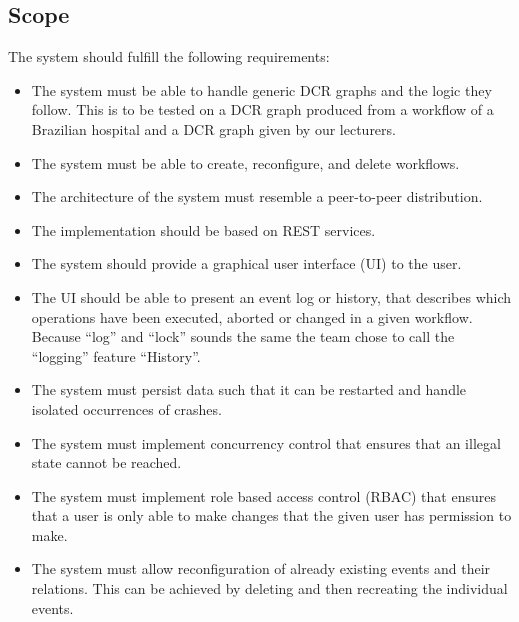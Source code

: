 \subsection{Scope}
The system should fulfill the following requirements:
\begin{itemize}
\item The system must be able to handle generic DCR graphs and the logic they follow. This is to be tested on a DCR graph produced from a workflow of a Brazilian hospital and a DCR graph given by our lecturers.
\item The system must be able to create, reconfigure, and delete workflows.
\item The architecture of the system must resemble a peer-to-peer distribution.
\item The implementation should be based on REST services. 
\item The system should provide a graphical user interface (UI) to the user. 
\item The UI should be able to present an event log or history, that describes which operations have been executed, aborted or changed in a given workflow. Because “log” and “lock” sounds the same the team chose to call the “logging” feature “History”.
\item The system must persist data such that it can be restarted and handle isolated occurrences of crashes.
\item The system must implement concurrency control that ensures that an illegal state cannot be reached.
\item The system must implement role based access control (RBAC) that ensures that a user is only able to make changes that the given user has permission to make. 
\item The system must allow reconfiguration of already existing events and their relations. This can be achieved by deleting and then recreating the individual events. 
\end{itemize}